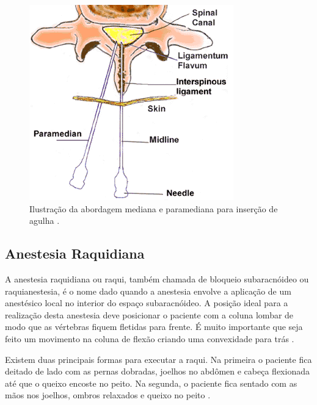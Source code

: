 \begin{figure}[ht!]
    \centering
    \includegraphics[width=0.6\linewidth]{capitulos/figuras/paramedian-midline-MedBroadcast-Tiff.png}
    \caption{Ilustração da abordagem mediana e paramediana para inserção de agulha \cite{MedBroadcast2018}.}
    \label{fig:abordagensInsercaoAgulha}
\end{figure}

\subsection{Anestesia Raquidiana} 
\label{sec:anestesiaRaquidiana}

A anestesia raquidiana  ou raqui, também chamada de bloqueio subaracnóideo ou  raquianestesia, é o nome dado quando a anestesia envolve a aplicação de um anestésico local no interior do espaço subaracnóideo. A posição ideal para a realização desta anestesia deve posicionar o paciente com a coluna lombar de modo que as vértebras fiquem fletidas para frente. É muito importante que seja feito um movimento na coluna de flexão criando uma convexidade para trás \cite{Anesclin2019}.

Existem duas principais formas para executar a raqui. Na primeira o paciente fica deitado de lado com as pernas dobradas, joelhos no abdômen e cabeça flexionada até que o queixo encoste no peito. Na segunda, o paciente fica sentado com as mãos nos joelhos, ombros relaxados e queixo no peito \cite{Anesclin2019}.

